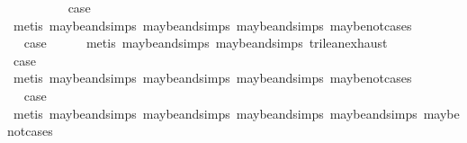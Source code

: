\begin{isabellebody}
\isamarkupfalse%
\isanewline
\ \ \isamarkupfalse%
\ {\isachardoublequoteopen}{}{\isacharunderscore}{}{\isachardoublequoteclose}\isanewline
\ \ \isamarkupfalse%
\ \isamarkupfalse%
\ {\isacharquery}case\isanewline
\ \ \ \ \isamarkupfalse%
\ {\isacharparenleft}metis\ maybe{\isacharunderscore}and{\isachardot}simps{\isacharparenleft}{}{\isacharparenright}\ maybe{\isacharunderscore}and{\isachardot}simps{\isacharparenleft}{}{\isacharparenright}\ maybe{\isacharunderscore}and{\isachardot}simps{\isacharparenleft}{}{\isacharparenright}\ maybe{\isacharunderscore}not{\isachardot}cases{\isacharparenright}\isanewline
{}\isamarkupfalse%
\isanewline
\ \ \isamarkupfalse%
\ {\isachardoublequoteopen}{}{\isacharunderscore}{}{\isachardoublequoteclose}\isanewline
\ \ \isamarkupfalse%
\ \isamarkupfalse%
\ {\isacharquery}case\isanewline
\ \ \ \ \isamarkupfalse%
\ {\isacharparenleft}metis\ maybe{\isacharunderscore}and{\isachardot}simps{\isacharparenleft}{}{\isacharparenright}\ maybe{\isacharunderscore}and{\isachardot}simps{\isacharparenleft}{}{\isacharparenright}\ trilean{\isachardot}exhaust{\isacharparenright}\isanewline
{}\isamarkupfalse%
\isanewline
\ \ \isamarkupfalse%
\ {\isachardoublequoteopen}{}{\isacharunderscore}{}{\isachardoublequoteclose}\isanewline
\ \ \isamarkupfalse%
\ \isamarkupfalse%
\ {\isacharquery}case\isanewline
\ \ \ \ \isamarkupfalse%
\ {\isacharparenleft}metis\ maybe{\isacharunderscore}and{\isachardot}simps{\isacharparenleft}{}{\isacharparenright}\ maybe{\isacharunderscore}and{\isachardot}simps{\isacharparenleft}{}{\isacharparenright}\ maybe{\isacharunderscore}and{\isachardot}simps{\isacharparenleft}{}{\isacharparenright}\ maybe{\isacharunderscore}not{\isachardot}cases{\isacharparenright}\isanewline
{}\isamarkupfalse%
\isanewline
\ \ \isamarkupfalse%
\ {}\isanewline
\ \ \isamarkupfalse%
\ \isamarkupfalse%
\ {\isacharquery}case\isanewline
\ \ \ \ \isamarkupfalse%
\ {\isacharparenleft}metis\ maybe{\isacharunderscore}and{\isachardot}simps{\isacharparenleft}{}{\isacharparenright}\ maybe{\isacharunderscore}and{\isachardot}simps{\isacharparenleft}{}{\isacharparenright}\ maybe{\isacharunderscore}and{\isachardot}simps{\isacharparenleft}{}{\isacharparenright}\ maybe{\isacharunderscore}and{\isachardot}simps{\isacharparenleft}{}{\isacharparenright}\ maybe{\isacharunderscore}not{\isachardot}cases{\isacharparenright}\isanewline

\end{isabellebody}
